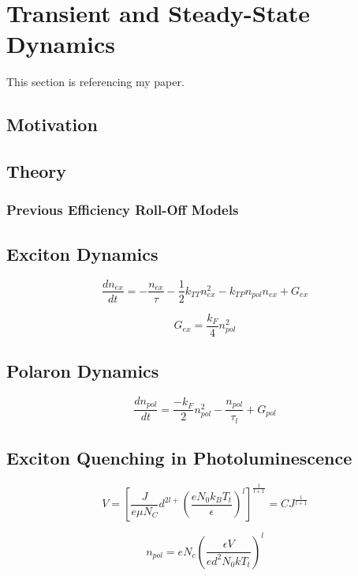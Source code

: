 \documentclass[../thesis.tex]{subfiles}
\begin{document}
\chapter{Transient and Steady-State Dynamics}

This section is referencing my paper.\cite{Hershey2016,Hershey2017}
\section{Motivation}
\section{Theory}
\subsection{Previous Efficiency Roll-Off Models}
\section{Exciton Dynamics}
\begin{equation}
\frac{dn_{ex}}{dt} = - \frac{n_{ex}}{\tau}-\frac{1}{2}k_{TT}n_{ex}^2-k_{TP}n_{pol}n_{ex}+G_{ex}
\label{eqn:exciton_rate}
\end{equation}

\begin{equation}
G_{ex}=\frac{k_F}{4}n_{pol}^2
\label{eqn:exciton_formation}
\end{equation}


\section{Polaron Dynamics}

\begin{equation}
\frac{dn_{pol}}{dt}=\frac{-k_F}{2}n_{pol}^2-\frac{n_{pol}}{\tau_l}+G_{pol}
\label{eqn:polaron_rate}
\end{equation}

\section{Exciton Quenching in Photoluminescence}

\begin{equation}
V=\left[ \frac{J}{e\mu N_C}d^{2l+}\left( \frac{eN_0k_BT_t}{\epsilon} \right)^l \right]^{\frac{1}{l+1}}=CJ^{\frac{1}{l+1}}
\label{eqn:ktpVoltage}
\end{equation}

\begin{equation}
n_{pol}=eN_c\left(\frac{\epsilon V}{ed^2N_0kT_t}\right)^l
\label{eqn:kptDensity}
\end{equation}
\end{document}
